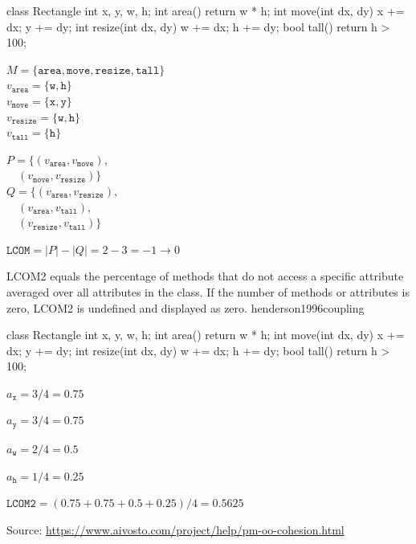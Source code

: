 \documentclass{article}
\begin{document}
\begin{multicols}{2}
{\small\begin{ffcode}
class Rectangle {
  int x, y, w, h;
  int area() {
    return w * h; }
  int move(int dx, dy) {
    x += dx; y += dy; }
  int resize(int dx, dy) {
    w += dx; h += dy; }
  bool tall() {
    return h > 100; }
}
\end{ffcode}
}
\par\columnbreak\par
{\small\( M = \{ \texttt{area}, \texttt{move}, \texttt{resize}, \texttt{tall} \} \) \\
\( v_\texttt{area} = \{ \texttt{w}, \texttt{h} \} \) \\
\( v_\texttt{move} = \{ \texttt{x}, \texttt{y} \} \) \\
\( v_\texttt{resize} = \{ \texttt{w}, \texttt{h} \} \) \\
\( v_\texttt{tall} = \{ \texttt{h} \} \) \par
\( P = \{ (v_\texttt{area}, v_\texttt{move}), \) \\
\( \quad (v_\texttt{move}, v_\texttt{resize}) \} \) \\
\( Q = \{ (v_\texttt{area}, v_\texttt{resize}), \) \\
\( \quad (v_\texttt{area}, v_\texttt{tall}), \) \\
\( \quad (v_\texttt{resize}, v_\texttt{tall}) \} \) \par
\( \texttt{LCOM} = |P| - |Q| = 2 - 3 = -1 \to 0\) \\}
\end{multicols}
\plush{}

  {LCOM2 equals the percentage of methods that do not access a specific attribute averaged over all attributes in the class. If the number of methods or attributes is zero, LCOM2 is undefined and displayed as zero.}
  {henderson1996coupling}

\begin{multicols}{2}
{\small\begin{ffcode}
class Rectangle {
  int x, y, w, h;
  int area() {
    return w * h; }
  int move(int dx, dy) {
    x += dx; y += dy; }
  int resize(int dx, dy) {
    w += dx; h += dy; }
  bool tall() {
    return h > 100; }
}
\end{ffcode}
}
\par\columnbreak\par
\( a_\texttt{x} = 3 / 4 = 0.75 \) \par
\( a_\texttt{y} = 3 / 4 = 0.75 \) \par
\( a_\texttt{w} = 2 / 4 = 0.5 \) \par
\( a_\texttt{h} = 1 / 4 = 0.25 \) \par
\( \texttt{LCOM2} = (0.75 + 0.75 + 0.5 + 0.25) / 4 = 0.5625 \) \par
{\scriptsize Source: \url{https://www.aivosto.com/project/help/pm-oo-cohesion.html}\par}
\end{multicols}
\plush{}
\end{document}
